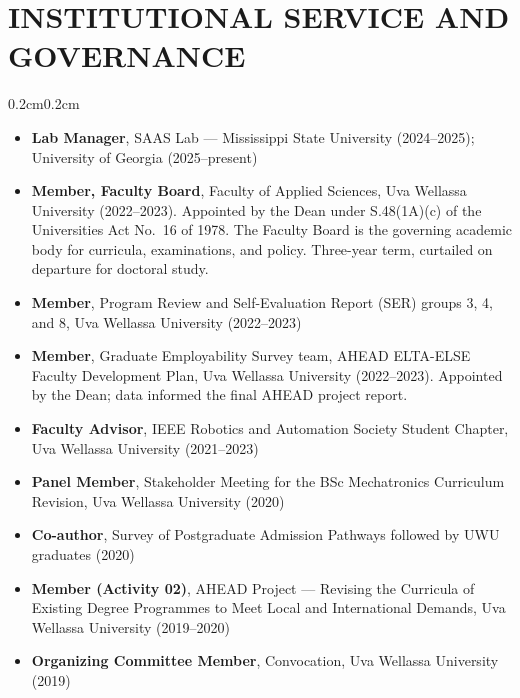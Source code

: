 \documentclass[10pt, letterpaper]{article}
\newenvironment{highlights}{%
    \begin{itemize}[topsep=0.08cm, parsep=0.08cm, partopsep=0pt,
                    itemsep=0pt, leftmargin=0.4cm + 10pt]
}{\end{itemize}}
\newenvironment{onecolentry}{%
    \begin{adjustwidth}{0.2cm}{0.2cm}
}{\end{adjustwidth}}
\begin{document}
\section{INSTITUTIONAL SERVICE AND GOVERNANCE}
\vspace{0.08cm}
\begin{onecolentry}
    \begin{highlights}
        \item \textbf{Lab Manager}, SAAS Lab --- Mississippi State University
              (2024--2025); University of Georgia (2025--present)
        \item \textbf{Member, Faculty Board}, Faculty of Applied Sciences,
              Uva Wellassa University (2022--2023). Appointed by the Dean under
              S.48(1A)(c) of the Universities Act No.~16 of 1978. The Faculty Board is
              the governing academic body for curricula, examinations, and policy.
              Three-year term, curtailed on departure for doctoral study.
        \item \textbf{Member}, Program Review and Self-Evaluation Report (SER) groups
              3, 4, and 8, Uva Wellassa University (2022--2023)
        \item \textbf{Member}, Graduate Employability Survey team, AHEAD ELTA-ELSE
              Faculty Development Plan, Uva Wellassa University (2022--2023).
              Appointed by the Dean; data informed the final AHEAD project report.
        \item \textbf{Faculty Advisor}, IEEE Robotics and Automation Society Student
              Chapter, Uva Wellassa University (2021--2023)
        \item \textbf{Panel Member}, Stakeholder Meeting for the BSc Mechatronics
              Curriculum Revision, Uva Wellassa University (2020)
        \item \textbf{Co-author}, Survey of Postgraduate Admission Pathways followed by
              UWU graduates (2020)
        \item \textbf{Member (Activity 02)}, AHEAD Project --- Revising the Curricula
              of Existing Degree Programmes to Meet Local and International Demands,
              Uva Wellassa University (2019--2020)
        \item \textbf{Organizing Committee Member}, Convocation, Uva Wellassa
              University (2019)
    \end{highlights}
\end{onecolentry}
\vspace{0.18cm}
\end{document}
